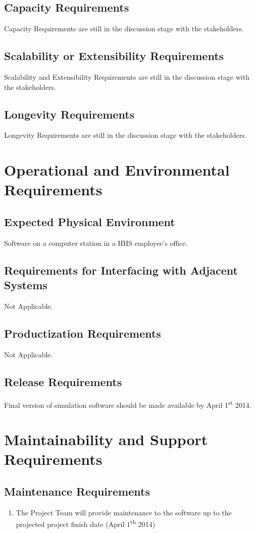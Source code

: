 \documentclass[paper=letter, fontsize=10pt]{scrartcl}
\numberwithin{equation}{section}		%
\numberwithin{figure}{section}			%
\numberwithin{table}{section}				%
\newcommand{\ts}{\textsuperscript}
\begin{document}
\subsection{Capacity Requirements}
Capacity Requirements are still in the discussion stage with the stakeholders.
\subsection{Scalability or Extensibility Requirements}
Scalability and Extensibility Requirements are still in the discussion stage with the stakeholders.
\subsection{Longevity Requirements}
Longevity Requirements are still in the discussion stage with the stakeholders.

\section{Operational and Environmental Requirements}
\subsection{Expected Physical Environment}
Software on a computer station in a HHS employee's office.
\subsection{Requirements for Interfacing with Adjacent Systems}
Not Applicable.
\subsection{Productization Requirements}
Not Applicable.
\subsection{Release Requirements}
Final version of simulation software should be made available by April 1\ts{st} 2014.

\section{Maintainability and Support Requirements}
\subsection{Maintenance Requirements}
	\begin{enumerate}
		\item The Project Team will provide maintenance to the software up to the projected project finish date (April 1\ts{th} 2014)
	\end{enumerate}
\end{document}
